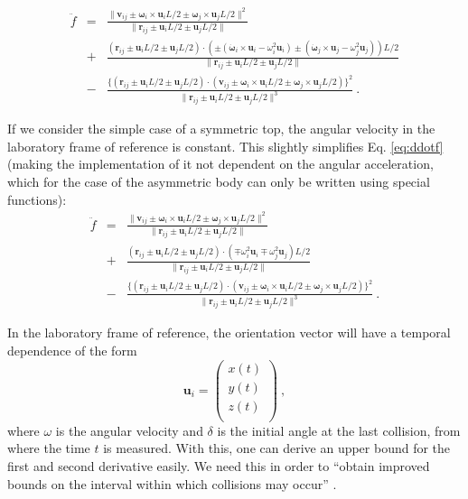 \documentclass[aps,pre,onecolumn,preprint,showpacs]{revtex4}
\begin{document}
\begin{eqnarray}
  \label{eq:ddotf}
 \nonumber  \ddot{f} &=&  \frac{\|\mathbf{v}_{ij} \pm \mathbf{\omega}_i\times\mathbf{u}_{i}L/2 \pm \mathbf{\omega}_j\times\mathbf{u}_{j}L/2\|^2}{\|\mathbf{r}_{ij} \pm \mathbf{u}_{i}L/2 \pm \mathbf{u}_{j}L/2\|} \\
&+&  \frac{ (\mathbf{r}_{ij} \pm \mathbf{u}_{i}L/2 \pm \mathbf{u}_{j}L/2)\cdotp(\pm (\dot{\mathbf{\omega}}_i\times\mathbf{u}_i - \omega_i^2\mathbf{u}_i) \pm (\dot{\mathbf{\omega}}_j\times\mathbf{u}_j - \omega_j^2\mathbf{u}_j))L/2}{\|\mathbf{r}_{ij} \pm \mathbf{u}_{i}L/2 \pm \mathbf{u}_{j}L/2\|} \\
 \nonumber &-& \frac{\{(\mathbf{r}_{ij} \pm \mathbf{u}_{i}L/2 \pm \mathbf{u}_{j}L/2)\cdotp(\mathbf{v}_{ij} \pm \mathbf{\omega}_i\times\mathbf{u}_{i}L/2 \pm \mathbf{\omega}_j\times\mathbf{u}_{j}L/2)\}^2}{\|\mathbf{r}_{ij} \pm \mathbf{u}_{i}L/2 \pm \mathbf{u}_{j}L/2\|^3} ~.
\end{eqnarray}


If we consider the simple case of a symmetric top, the angular
velocity in the laboratory frame of reference is constant. This
slightly simplifies Eq. \eqref{eq:ddotf} (making the implementation of
it not dependent on the angular acceleration, which for the case of
the asymmetric body can only be written using special functions):
\begin{eqnarray}
  \label{eq:ddotfST}
  \nonumber \ddot{f} &=&  \frac{\|\mathbf{v}_{ij} \pm \mathbf{\omega}_i\times\mathbf{u}_{i}L/2 \pm \mathbf{\omega}_j\times\mathbf{u}_{j}L/2\|^2}{\|\mathbf{r}_{ij} \pm \mathbf{u}_{i}L/2 \pm \mathbf{u}_{j}L/2\|} \\
&+&  \frac{ (\mathbf{r}_{ij} \pm \mathbf{u}_{i}L/2 \pm \mathbf{u}_{j}L/2)\cdotp(\mp  \omega_i^2\mathbf{u}_i \mp  \omega_j^2\mathbf{u}_j)L/2}{\|\mathbf{r}_{ij} \pm \mathbf{u}_{i}L/2 \pm \mathbf{u}_{j}L/2\|} \\
&-& \nonumber \frac{\{(\mathbf{r}_{ij} \pm \mathbf{u}_{i}L/2 \pm \mathbf{u}_{j}L/2)\cdotp(\mathbf{v}_{ij} \pm \mathbf{\omega}_i\times\mathbf{u}_{i}L/2 \pm \mathbf{\omega}_j\times\mathbf{u}_{j}L/2)\}^2}{\|\mathbf{r}_{ij} \pm \mathbf{u}_{i}L/2 \pm \mathbf{u}_{j}L/2\|^3} ~.
\end{eqnarray}

In the laboratory frame of reference, the orientation vector will have
a temporal dependence of the form 
\[\mathbf{u}_i =
\left( {\begin{array}{cc}
x(t) \\
y(t) \\
z(t) \\
\end{array} } \right) ~,\]
where $\omega$ is the angular velocity and $\delta$ is the initial angle at the last
collision, from where the time $t$ is measured. With this, one can
derive an upper bound for the first and second derivative easily. We
need this in order to ``obtain improved bounds on the interval within
which collisions may occur'' \cite{frenkel}.
\end{document}
